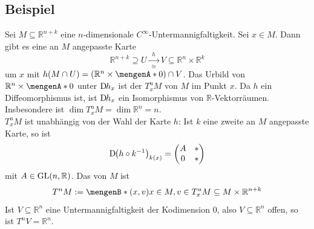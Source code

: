 \subsection[Beispiel: Tangentialraum von Untermannigfaltigkeiten des $\mathds{R}^{n+k}$]{Beispiel} %
\label{sub:183}
Sei $M \subseteq \mathds{R}^{n+k}$ eine $n$-dimensionale $C^\infty$-Untermannigfaltigkeit. Sei $x \in M$. Dann gibt es eine an $M$ angepasste Karte 
\[
	\mathds{R}^{n+k} \supseteq U \xrightarrow[\cong]{\enspace h \enspace} V \subseteq \mathds{R}^n \times \mathds{R}^k 
\]
um $x$ mit $h(M \cap U) =(\mathds{R}^n \times \set{0})\cap V$.
Das Urbild von $\mathds{R}^n \times \set{0}$ unter $\mathrm{D}\mkern-1.5mu h_x$ ist der  $T^u_x M$ von $M$ im Punkt
$x$. Da $h$ ein Diffeomorphismus ist, ist $\mathrm{D}\mkern-1.5mu h_x$ ein Isomorphismus von $\mathds{R}$-Vektorräumen. Insbesondere ist $\dim T^u_x M = \dim \mathds{R}^n = n$. \smallskip\\
$T_x^u M$ ist unabhängig von der Wahl der Karte $h$: Ist $k$ eine zweite an $M$ angepasste Karte, so ist 
\[
	\D \enbrace*{h \circ k ^{-1}}_{k(x)} = \begin{pmatrix}
		A & * \\
		0 & *
	\end{pmatrix}
\]
mit $A \in \operatorname{GL}(n,\mathbb{R})$. Das  von $M$ ist 
\[
	T^n M := \set[(x,v)]{x \in M, v \in T_x^u M} \subseteq M \times \mathds{R}^{n+k} 
\]
Ist $V \subseteq \mathds{R}^n$ eine Untermannigfaltigkeit der Kodimension $0$, also $V \subseteq \mathds{R}^n$ offen, so ist $T^n V = \mathds{R}^n$.

